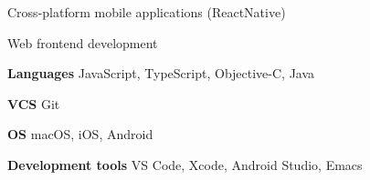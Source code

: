 \documentclass[11pt,a4paper,sans]{awesomecv}
\begin{document}
\makecvheader[C]

\let\bodyfont\cambria

\newcommand{\cvlistitem}[1]{\item {\fontsize{12pt}{1em}\bodyfont\upshape\color{darktext} #1}}
\newenvironment{cvlist}{
  \begin{description}[
      itemindent=0em,
      labelwidth=0em,
      labelsep=0em,
      leftmargin=0em,
      parsep=1ex
    ]
}{
  \end{description}
}

\newcommand{\cvdescriptionitem}[2]{\item[{\fontsize{12pt}{1em}\bodyfont\bfseries\color{darktext} #1}] {\fontsize{12pt}{1em}\cambria\upshape\color{darktext} #2}}
\newenvironment{cvdescription}{
  \begin{description}[
      parsep=1ex,
    ]
}{
  \end{description}
}

\begin{cvlist}
\cvlistitem{Cross-platform mobile applications (ReactNative)}
\cvlistitem{Web frontend development}
\end{cvlist}

\begin{cvdescription}
\cvdescriptionitem{Languages}{JavaScript, TypeScript, Objective-C, Java}
\cvdescriptionitem{VCS}{Git}
\cvdescriptionitem{OS}{macOS, iOS, Android}
\cvdescriptionitem{Development tools}{VS Code, Xcode, Android Studio, Emacs}
\end{cvdescription}

\renewcommand*{\entrypositionstyle}[1]{{\fontsize{12pt}{1em}\bodyfont\bfseries\color{darktext} #1}}
\renewcommand*{\entrydatestyle}[1]{{\fontsize{11pt}{1em}\bodyfont\slshape\color{graytext} #1}}
\newcommand*{\entryemployerstyle}[1]{{\fontsize{11pt}{1em}\bodyfont\bfseries\color{graytext} #1}}
\newcommand*{\entryurlstyle}[1]{{\fontsize{11pt}{1em}\bodyfont\upshape\color{graytext} #1}}
\newcommand*{\entrydescriptionstyle}[1]{{\fontsize{12pt}{1em}\bodyfont\upshape\color{text} #1}}

\renewcommand*{\cventry}[5]{
  \setlength\tabcolsep{0pt}
  \setlength{\extrarowheight}{1ex}
  \begin{tabular*}{\textwidth}{@{\extracolsep{\fill}} l r}
    \noalign{\vspace{-2ex}}
    \entrypositionstyle{#1} & \entrydatestyle{#2} \\
    \entryemployerstyle{#3} & \entryurlstyle{\url{#4}} \\
    \multicolumn{2}{L{\textwidth}}{
      \entrydescriptionstyle{#5}
    }
  \end{tabular*}
}
\end{document}
